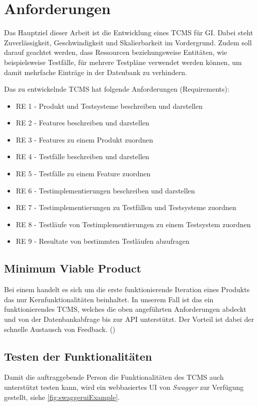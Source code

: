\documentclass[a4paper, fontsize=11pt, parskip=half, twoside, headings=openright]{scrreprt}
\begin{document}
	
	
	\chapter{Anforderungen} \label{chapter:requiremnts}
	Das Hauptziel dieser Arbeit ist die Entwicklung eines \ac{TCMS} für \ac{GI}.
	Dabei steht Zuverlässigkeit, Geschwindigkeit und Skalierbarkeit im Vordergrund.
	Zudem soll darauf geachtet werden, dass Ressourcen beziehungsweise Entitäten, wie beispielsweise Testfälle, für mehrere Testpläne verwendet werden können, um damit mehrfache Einträge in der Datenbank zu verhindern.
	
	Das zu entwickelnde \ac{TCMS} hat folgende Anforderungen (Requirements):
	
	\begin{itemize}
		\setlength\itemsep{-0.5em}
		\item RE 1 - Produkt und Testsysteme beschreiben und darstellen
		\item RE 2 - Features beschreiben und darstellen
		\item RE 3 - Features zu einem Produkt zuordnen
		\item RE 4 - Testfälle beschreiben und darstellen
		\item RE 5 - Testfälle zu einem Feature zuordnen
		\item RE 6 - Testimplementierungen beschreiben und darstellen
		\item RE 7 - Testimplementierungen zu Testfällen und Testsysteme zuordnen
		\item RE 8 - Testläufe von Testimplementierungen zu einem Testsystem zuordnen
		\item RE 9 - Resultate von bestimmten Testläufen abzufragen
	\end{itemize}
	
	
	\section{Minimum Viable Product}
	Bei einem  handelt es sich um die erste funktionierende Iteration eines Produkts das nur Kernfunktionalitäten beinhaltet.
	In unserem Fall ist das ein funktionierendes \ac{TCMS}, welches die oben angeführten Anforderungen abdeckt und von der Datenbankabfrage bis zur \ac{API} unterstützt.
	Der Vorteil ist dabei der schnelle Austausch von Feedback. (\textcite{alliance_what_2017})
	
	
	\section{Testen der Funktionalitäten}
	Damit die auftraggebende Person die Funktionalitäten des \ac{TCMS} auch  unterstützt testen kann, wird ein webbasiertes \ac{UI} von \emph{Swagger} zur Verfügung gestellt, siehe \autoref{fig:swaggeruiExample}.
	
\end{document}
